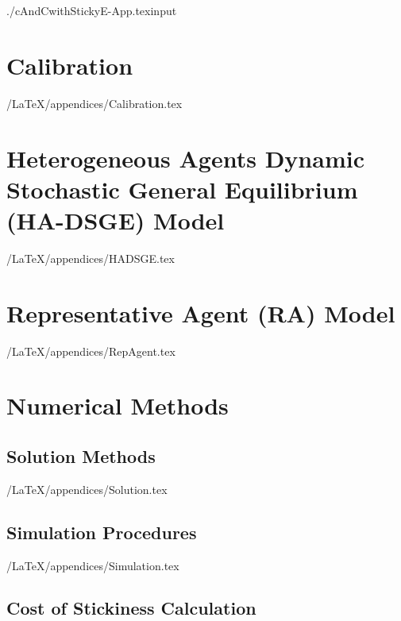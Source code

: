 \documentclass[titlepage]{\econtex}
\begin{document}
	\titlepagefinish
	\setcounter{page}{1}
	\setcounter{table}{4} 
	\setcounter{equation}{20} 
	
	\pagebreak

\appendix



\begin{verbatimwrite}{./cAndCwithStickyE-App.texinput}
  \hypertarget{Appendix}{}
\hypertarget{Calibration-Appendix}{}
\section{Calibration}\label{app:Calibration}

\econtexRoot/LaTeX/appendices/Calibration.tex

\section{Heterogeneous Agents Dynamic Stochastic General Equilibrium (HA-DSGE) Model}
\label{sec:HADSGE}

\econtexRoot/LaTeX/appendices/HADSGE.tex



\section{Representative Agent (RA) Model}\label{sec:RepAgent}

\econtexRoot/LaTeX/appendices/RepAgent.tex


\section{Numerical Methods}\label{appendix:Numeric}

\subsection{Solution Methods}\label{appendix:Solution}

\econtexRoot/LaTeX/appendices/Solution.tex


\subsection{Simulation Procedures}\label{appendix:Simulation}

\econtexRoot/LaTeX/appendices/Simulation.tex


\subsection{Cost of Stickiness Calculation}\label{appendix:uCost}


\end{verbatimwrite}
\end{document}
